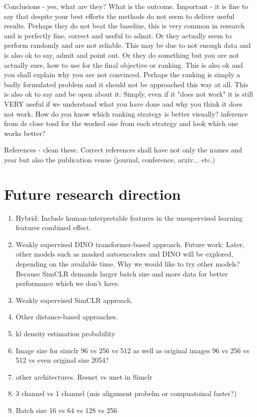 	Conclusions - yes, what are they? What is the outcome. Important - it is fine to say that despite your best efforts the methods do not seem to
	 deliver useful results. Perhaps they do not beat the baseline, this is very common in research and is perfectly fine, correct and useful to admit.
	  Or they actually seem to perform randomly and are not reliable. This may be due to not enough data and is also ok to say, admit and point out. Or 
	  they do something but you are not actually sure, how to use for the final objective or ranking. This is also ok and you shall explain why you are 
	  not convinced. Perhaps the ranking is simply a badly formulated problem and it should not be approached this way at all. This is also ok to say and 
	  be open about it. Simply, even if it "does not work" it is still VERY useful if we understand what you have done and why you think it does not work.	
How do you know which ranking strategy is better visually? inference from ds close tosd for the worked one from each strategy and look which one works 
better?

References - clean these. Correct references shall have not only the names and year but also the publication venue (journal, conference, arxiv... etc.)

\section{Future research direction}

\begin{enumerate}
    \item Hybrid: Include human-interpretable features in the unsupervised learning features combined effect.
    \item Weakly supervised DINO transformer-based approach. Future work: Later, other models such as masked autoencoders and DINO will be explored, depending on the available time.
	Why we would like to try other models? Because SimCLR demands larger batch size and more data for better performance which we don't have.
    \item Weakly supervised SimCLR approach.
    \item Other distance-based approaches.
    \item kl density estimation probability
    \item Image size for simclr 96 vs 256 vs 512 as well as original images 96 vs 256 vs 512 vs even original size 2054?
    \item other architectures. Resnet vs unet in Simclr
    \item 3 channel vs 1 channel (mis alignment probelm or compuatoinal faster?)
    \item Batch size 16 vs 64 vs 128 vs 256

\end{enumerate}